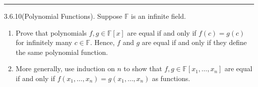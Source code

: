 \documentclass[a4paper, 12pt]{article}
\begin{document}
\noindent\rule{7in}{2.8pt}
\begin{problem}{3.6.10(Polynomial Functions).}
Suppose \(\mathbb{F}\) is an infinite field.
\begin{enumerate}[(1)]
	\item Prove that polynomials \(f,g\in \mathbb{F}[x]\) are equal if and only if \(f(c)=g(c)\) for infinitely many \(c\in \mathbb{F}\). Hence, \(f\) and \(g\) are equal if and only if 
	      they define the same polynomial function.
	\item More generally, use induction on \(n\) to show that \(f,g\in \mathbb{F}[x_1,\ldots,x_n]\) are equal if and only if \(f(x_1,\ldots,x_n)=g(x_1,\ldots,x_n)\) as functions.
\end{enumerate}
\end{problem}
\end{document}
